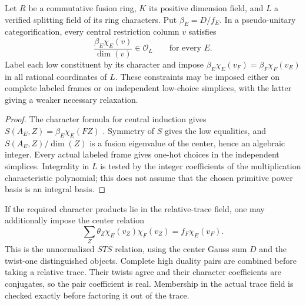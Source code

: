 \begin{proposition}
Let $R$ be a commutative fusion ring, $K$ its positive dimension field,
and $L$ a verified splitting field of its ring characters. Put
$\beta_E=D/f_E$. In a pseudo-unitary categorification, every central
restriction column $v$ satisfies
\[
 \frac{\beta_E\chi_E(v)}{\dim(v)}\in\mathcal O_L
 \qquad\text{for every }E.
\]
Label each low constituent by its character and impose
$\beta_E\chi_E(v_F)=\beta_F\chi_F(v_E)$ in all rational coordinates
of $L$. These constraints may be imposed either on complete labeled
frames or on independent low-choice simplices, with the latter giving
a weaker necessary relaxation.
\end{proposition}
\begin{proof}
The character formula for central induction gives
$S(A_E,Z)=\beta_E\chi_E(FZ)$
\cite[Lemma~4.3 and Corollary~4.5]{DeshpandeCenter}.
Symmetry of $S$ gives the low equalities, and
$S(A_E,Z)/\dim(Z)$ is a fusion eigenvalue of the center, hence an
algebraic integer. Every actual labeled frame gives one-hot choices
in the independent simplices. Integrality in $L$ is tested by the
integer coefficients of the multiplication characteristic polynomial;
this does not assume that the chosen primitive power basis is an
integral basis.
\end{proof}

If the required character products lie in the relative-trace field,
one may additionally impose the center relation
\[
 \sum_Z\theta_Z\chi_E(v_Z)\chi_F(v_Z)
   =f_F\chi_E(v_F).
\]
This is the unnormalized $STS$ relation, using the center Gauss sum
$D$ and the twist-one distinguished objects. Complete high duality
pairs are combined before taking a relative trace. Their twists agree
and their character coefficients are conjugates, so the pair
coefficient is real. Membership in the actual trace field is checked
exactly before factoring it out of the trace.

